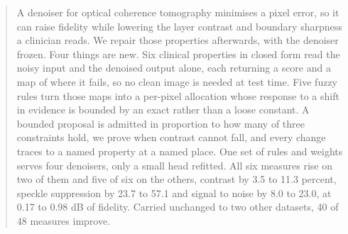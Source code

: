 \begin{abstract}
A denoiser for optical coherence tomography minimises a pixel error, so it can raise fidelity while
lowering the layer contrast and boundary sharpness a clinician reads. We repair those properties
afterwards, with the denoiser frozen. Four things are new. Six clinical properties in closed form read
the noisy input and the denoised output alone, each returning a score and a map of where it fails, so
no clean image is needed at test time. Five fuzzy rules turn those maps into a per-pixel allocation
whose response to a shift in evidence is bounded by an exact rather than a loose constant. A bounded
proposal is admitted in proportion to how many of three constraints hold, we prove when contrast
cannot fall, and every change traces to a named property at a named place. One set of rules and
weights serves four denoisers, only a small head refitted. All six measures rise on two of them and
five of six on the others, contrast by 3.5 to 11.3 percent, speckle suppression by 23.7 to 57.1 and
signal to noise by 8.0 to 23.0, at 0.17 to 0.98 dB of fidelity. Carried unchanged to two other
datasets, 40 of 48 measures improve.
\end{abstract}
